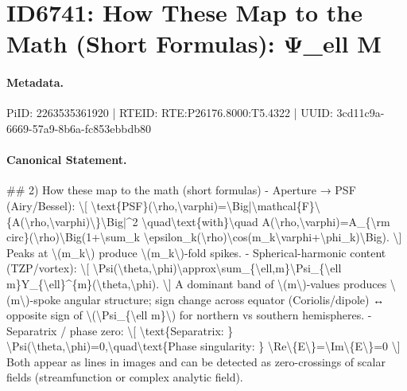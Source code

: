 \section*{ID6741: How These Map to the Math (Short Formulas): Ψ\_ell M}
\paragraph{Metadata.}
PiID: 2263535361920 | RTEID: RTE:P26176.8000:T5.4322 | UUID: 3cd11c9a-6669-57a9-8b6a-fc853ebbdb80

\paragraph{Canonical Statement.}
\#\# 2) How these map to the math (short formulas) - Aperture → PSF (Airy/Bessel): \textbackslash{}[ \textbackslash{}text\{PSF\}(\textbackslash{}rho,\textbackslash{}varphi)=\textbackslash{}Big|\textbackslash{}mathcal\{F\}\textbackslash{}\{A(\textbackslash{}rho,\textbackslash{}varphi)\textbackslash{}\}\textbackslash{}Big|\textasciicircum{}2 \textbackslash{}quad\textbackslash{}text\{with\}\textbackslash{}quad A(\textbackslash{}rho,\textbackslash{}varphi)=A\_\{\textbackslash{}rm circ\}(\textbackslash{}rho)\textbackslash{}Big(1+\textbackslash{}sum\_k \textbackslash{}epsilon\_k(\textbackslash{}rho)\textbackslash{}cos(m\_k\textbackslash{}varphi+\textbackslash{}phi\_k)\textbackslash{}Big). \textbackslash{}] Peaks at \textbackslash{}(m\_k\textbackslash{}) produce \textbackslash{}(m\_k\textbackslash{})-fold spikes. - Spherical-harmonic content (TZP/vortex): \textbackslash{}[ \textbackslash{}Psi(\textbackslash{}theta,\textbackslash{}phi)\textbackslash{}approx\textbackslash{}sum\_\{\textbackslash{}ell,m\}\textbackslash{}Psi\_\{\textbackslash{}ell m\}Y\_\{\textbackslash{}ell\}\textasciicircum{}\{m\}(\textbackslash{}theta,\textbackslash{}phi). \textbackslash{}] A dominant band of \textbackslash{}(m\textbackslash{})-values produces \textbackslash{}(m\textbackslash{})-spoke angular structure; sign change across equator (Coriolis/dipole) ↔ opposite sign of \textbackslash{}(\textbackslash{}Psi\_\{\textbackslash{}ell m\}\textbackslash{}) for northern vs southern hemispheres. - Separatrix / phase zero: \textbackslash{}[ \textbackslash{}text\{Separatrix: \} \textbackslash{}Psi(\textbackslash{}theta,\textbackslash{}phi)=0,\textbackslash{}quad\textbackslash{}text\{Phase singularity: \} \textbackslash{}Re\textbackslash{}\{E\textbackslash{}\}=\textbackslash{}Im\textbackslash{}\{E\textbackslash{}\}=0 \textbackslash{}] Both appear as lines in images and can be detected as zero-crossings of scalar fields (streamfunction or complex analytic field).

